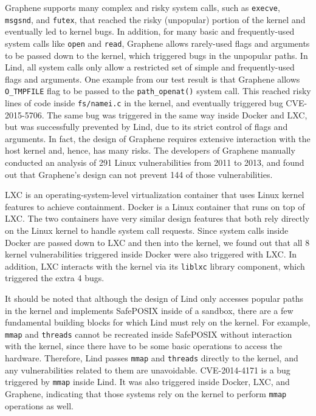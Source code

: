 {{{Graphene supports many complex and risky system calls, such as \texttt{execve}, \texttt{msgsnd}, and \texttt{futex},
that reached the risky (unpopular) portion of the kernel and eventually led to kernel bugs.
In addition, for many basic and frequently-used system calls like \texttt{open} and \texttt{read},
Graphene allows rarely-used flags and arguments to be passed down to the kernel, which triggered bugs in
the unpopular paths.
In Lind, all system calls only allow a restricted set of simple and frequently-used flags and arguments.
One example from our test result is that Graphene allows \texttt{O\_TMPFILE} flag to be passed to the
\texttt{path\_openat()} system call. This reached risky lines of code inside \texttt{fs/namei.c} in the kernel,
and eventually triggered bug CVE-2015-5706.
The same bug was triggered in the same way inside Docker and LXC, but was successfully prevented by Lind,
due to its strict control of flags and arguments.
In fact, the design of Graphene requires extensive interaction
with the host kernel and, hence, has many risks. The developers of Graphene manually conducted
an analysis of 291 Linux vulnerabilities from 2011 to 2013, and found out that Graphene's design can not prevent 144 of those vulnerabilities.

LXC \cite{LXC} is an operating-system-level virtualization container that uses Linux kernel features to achieve containment.
Docker \cite{Docker} is a Linux container that runs on top of LXC. The two containers have very similar design features
that both rely directly on the Linux kernel to handle system call requests. Since system calls inside Docker are passed down
to LXC and then into the kernel, we found out that all 8 kernel vulnerabilities triggered inside Docker were also triggered
with LXC. In addition, LXC interacts with the kernel via its \texttt{liblxc} library component, which triggered the extra 4 bugs.

It should be noted that although the design of Lind only accesses popular paths in the kernel and implements SafePOSIX inside
of a sandbox, there are a few fundamental building blocks for which Lind must rely on the kernel. For example,
\texttt{mmap} and \texttt{threads} cannot be recreated inside SafePOSIX without interaction with the kernel, since there have
to be some basic operations to access the hardware. Therefore, Lind passes \texttt{mmap} and \texttt{threads}
directly to the kernel, and any vulnerabilities related to them are unavoidable.
CVE-2014-4171 is a bug triggered by \texttt{mmap} inside Lind. It was also triggered inside Docker, LXC, and Graphene, indicating
that those systems rely on the kernel to perform \texttt{mmap} operations as well.

}}}
